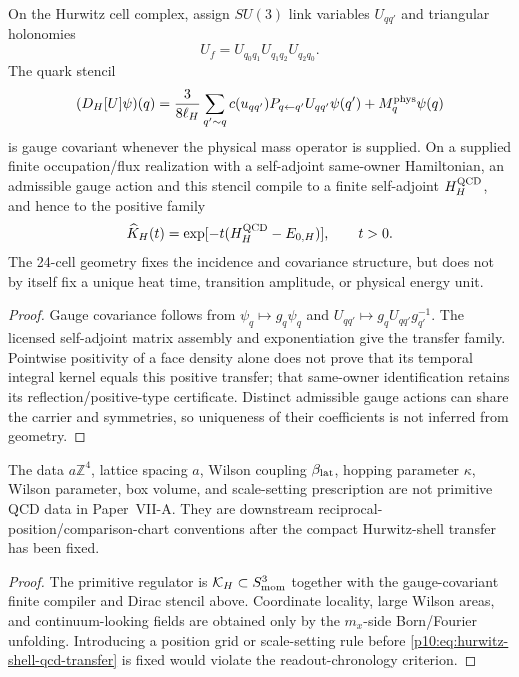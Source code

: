 \documentclass[12pt,a4paper]{article}
\begin{document}
\begin{theorem}
\label{p10:thm:hurwitz-shell-qcd-transfer-compiler}
On the Hurwitz cell complex, assign \(SU(3)\) link variables \(U_{qq'}\) and triangular holonomies
\begin{equation}
\label{p10:eq:hurwitz-triangular-face-holonomy}
U_f=U_{q_0q_1}U_{q_1q_2}U_{q_2q_0}.
\end{equation}
The quark stencil
\begin{equation}
\label{p10:eq:hurwitz-gauge-covariant-dirac}
(D_H[U]\psi)(q)=\frac{3}{8\ell_H}\sum_{q'\sim q}c(u_{qq'})P_{q\leftarrow q'}U_{qq'}\psi(q')+M_q^{\rm phys}\psi(q)
\end{equation}
is gauge covariant whenever the physical mass operator is supplied.  On a supplied finite occupation/flux realization with a self-adjoint
same-owner Hamiltonian, an admissible gauge action and this stencil compile
to a finite self-adjoint \(H_H^{\rm QCD}\), and hence to the positive family
\begin{equation}
\label{p10:eq:hurwitz-shell-qcd-transfer}
\widehat K_H(t)=\exp[-t(H_H^{\rm QCD}-E_{0,H})],\qquad t>0.
\end{equation}
The 24-cell geometry fixes the incidence and covariance structure, but does not by itself fix a unique heat time, transition amplitude, or physical energy unit.
\end{theorem}
\begin{proof}
Gauge covariance follows from \(\psi_q\mapsto g_q\psi_q\) and \(U_{qq'}\mapsto g_qU_{qq'}g_{q'}^{-1}\).  The licensed self-adjoint matrix assembly and exponentiation give the
transfer family. Pointwise positivity of a face density alone does not prove
that its temporal integral kernel equals this positive transfer; that
same-owner identification retains its reflection/positive-type certificate.
Distinct admissible gauge actions can share the carrier and symmetries, so
uniqueness of their coefficients is not inferred from geometry.
\end{proof}

\begin{corollary}
\label{p10:cor:no-primitive-position-lattice-input}
The data \(a\mathbb Z^4\), lattice spacing \(a\), Wilson coupling \(\beta_{\rm lat}\), hopping parameter \(\kappa\), Wilson parameter, box volume, and scale-setting prescription are not primitive QCD data in Paper~VII-A.  They are downstream reciprocal-position/comparison-chart conventions after the compact Hurwitz-shell transfer has been fixed.
\end{corollary}
\begin{proof}
The primitive regulator is \(\mathcal K_H\subset S^3_{\rm mom}\) together with the gauge-covariant finite compiler and Dirac stencil above.  Coordinate locality, large Wilson areas, and continuum-looking fields are obtained only by the \(m_x\)-side Born/Fourier unfolding.  Introducing a position grid or scale-setting rule before \eqref{p10:eq:hurwitz-shell-qcd-transfer} is fixed would violate the readout-chronology criterion.
\end{proof}
\end{document}
